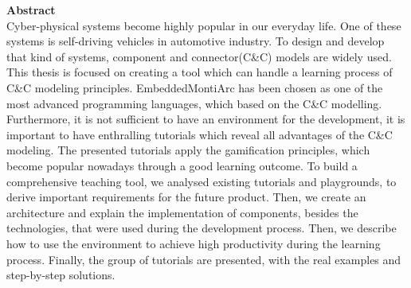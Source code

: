 \vspace*{2cm}

\vspace{10ex}
{\bf\Large Abstract} \\ [1em]
Cyber-physical systems become highly popular in our everyday life. One of these systems is self-driving vehicles in automotive industry. To design and develop that kind of systems, component and connector(C\&C) models are widely used. This thesis is focused on creating a tool which can handle a learning process of C\&C modeling principles. EmbeddedMontiArc has been chosen as one of the most advanced programming languages, which based on the C\&C modelling. Furthermore, it is not sufficient to have an environment for the development, it is important to have enthralling tutorials which reveal all advantages of the C\&C modeling. The presented tutorials apply the gamification principles, which become popular nowadays through a good learning outcome. To build a comprehensive teaching tool, we analysed existing tutorials and playgrounds, to derive important requirements for the future product. Then, we create an architecture and explain the implementation of components, besides the technologies, that were used during the development process. Then, we describe how to use the environment to achieve high productivity during the learning process. Finally, the group of tutorials are presented, with the real examples and step-by-step solutions.
\cleardoublepage
